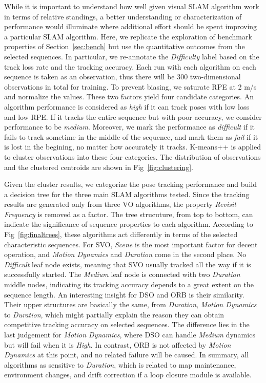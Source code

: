 While it is important to understand how well given visual SLAM algorithm
work in terms of relative standings, a better understanding or
characterization of performance would illuminate where additional effort
should be spent improving a particular SLAM algorithm. 
Here, we replicate the exploration of benchmark properties of 
Section~\ref{sec:bench} but use the quantitative outcomes from the
selected sequences.  In particular, we re-annotate the
\textit{Difficulty} label based on the track loss rate and the tracking
accuracy.
Each run with each algorithm on each sequence is taken as an observation, thus 
there will be 300 two-dimensional observations in total for training. 
To prevent biasing, we saturate RPE at 2 m/s and normalize the values. 
These two factors yield four candidate categories. 
An algorithm performance is considered as \textit{high} if it can track poses 
with low loss and low RPE. 
If it tracks the entire sequence but with poor accuracy, we consider
performance to be \textit{medium}. 
Moreover, we mark the performance as \textit{difficult} if it fails to track 
sometime in the middle of the sequence, and mark them as \textit{fail} if it 
is lost in the begining, no matter how accurately it tracks. 
K-means++\cite{arthur2007k} is applied to cluster observations into these four categories. The distribution of observations and the clustered centroids are 
shown in Fig~\ref{fig:clustering}. 

Given the cluster results, we categorize the pose tracking performance and 
build a decision tree for the three main SLAM algorithms tested. 
Since the tracking results are generated only from three VO algorithms,
the property \textit{Revisit Frequency} is removed as a factor.
The tree strucuture, from top to bottom, can indicate the significance
of sequence properties to each algorithm. 
According to Fig~\ref{fig:finaltrees}, these algorithms act differently
in terms of the selected characteristic sequences. 
For SVO, \textit{Scene} is the most important factor for decent operation, 
and \textit{Motion Dynamics} and \textit{Duration} come in the second place. 
No \textit{Difficult} leaf node exists, meaning that SVO usually tracked all 
the way if it is successfully started. 
The \textit{Medium} leaf node is connected with two \textit{Duration}
middle nodes, indicating its tracking accuracy depends to a great extent
on the sequence length. 
An interesting insight for DSO and ORB is their similarity. 
Their upper structures are basically the same, from \textit{Duration}, \textit{Motion Dynamics} to \textit{Duration}, which might partially explain the reason they can obtain competitive tracking accuracy on selected sequences.
The difference lies in the last judgement for \textit{Motion Dynamics}, where 
DSO can handle \textit{Medium} dynamics but will fail when it is \textit{High}. 
In contrast, ORB is not affected by \textit{Motion Dynamics} at this point, 
and no related failure will be caused. 
In summary, all algorithms as sensitive to \textit{Duration}, which is 
related to map maintenance, environment changes, and drift correction if
a loop closure module is available. 

